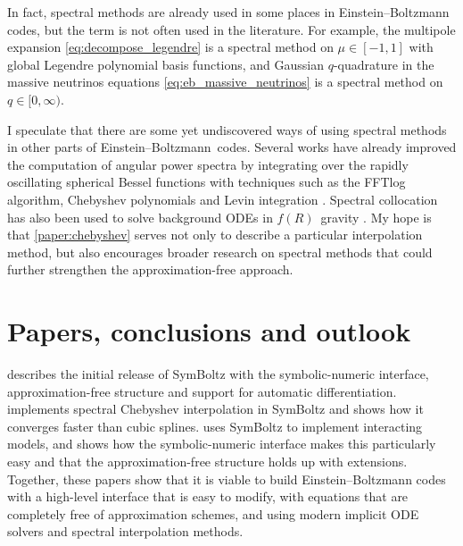 \documentclass[USenglish, thumbmarks]{uiophdthesis} %
\newcommand\EB{Einstein--Boltzmann}
\begin{document}
\bigskip

In fact, spectral methods are already used in some places in \EB{} codes,
but the term is not often used in the literature.
For example, the multipole expansion \eqref{eq:decompose_legendre} is a spectral method on $\mu \in [-1, 1]$ with global Legendre polynomial basis functions,
and Gaussian $q$-quadrature in the massive neutrinos equations \eqref{eq:eb_massive_neutrinos} is a spectral method on $q \in [0, \infty)$.

I speculate that there are some yet undiscovered ways of using spectral methods in other parts of \EB{} codes.
Several works have already improved the computation of angular power spectra
by integrating over the rapidly oscillating spherical Bessel functions
with techniques such as the FFTlog algorithm, Chebyshev polynomials and Levin integration
\cite[e.g.][]{schonebergTraditionalLineofSightApproach2018,fangLimberEfficientComputation2020a,leonardN5KChallengeNonLimber2023,chiarenzaBLASTLimberAngular2024,reischkePylevinEfficientNumerical2025a}.
Spectral collocation has also been used to solve background ODEs in $f(R)$ gravity \cite{ranaSpectralChebyshevApproximation2025a}.
My hope is that \cref{paper:chebyshev} serves not only to describe a particular interpolation method,
but also encourages broader research on spectral methods
that could further strengthen the approximation-free approach.

\section{Papers, conclusions and outlook}

 describes the initial release of SymBoltz
with the symbolic-numeric interface, approximation-free structure and support for automatic differentiation.
 implements spectral Chebyshev interpolation in SymBoltz
and shows how it converges faster than cubic splines.
 uses SymBoltz to implement interacting models,
and shows how the symbolic-numeric interface makes this particularly easy
and that the approximation-free structure holds up with extensions.
Together, these papers show that it is viable to build \EB{} codes
with a high-level interface that is easy to modify,
with equations that are completely free of approximation schemes,
and using modern implicit ODE solvers and spectral interpolation methods.
\end{document}
